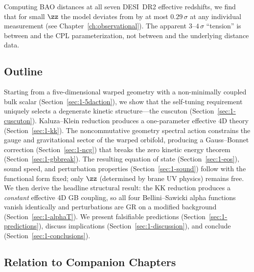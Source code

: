 Computing BAO distances at all seven DESI~DR2 effective redshifts, we find that for small $\zz$ the model deviates from \LCDM{} by at most $0.29\,\sigma$ at any individual measurement (see Chapter~\ref{ch:observational}). The apparent $3$--$4\,\sigma$ ``tension'' is between \LCDM{} and the CPL parameterization, not between \LCDM{} and the underlying distance data.

\subsection{Outline}
\label{sec:1-outline}

Starting from a five-dimensional warped geometry with a non-minimally coupled bulk scalar (Section~\ref{sec:1-5daction}), we show that the self-tuning requirement uniquely selects a degenerate kinetic structure---the cuscuton (Section~\ref{sec:1-cuscuton}). Kaluza--Klein reduction produces a one-parameter effective 4D theory (Section~\ref{sec:1-kk}). The noncommutative geometry spectral action constrains the gauge and gravitational sector of the warped orbifold, producing a Gauss--Bonnet correction (Section~\ref{sec:1-ncg}) that breaks the zero kinetic energy theorem (Section~\ref{sec:1-gbbreak}). The resulting equation of state (Section~\ref{sec:1-eos}), sound speed, and perturbation properties (Section~\ref{sec:1-sound}) follow with the functional form fixed; only $\zz$ (determined by brane UV physics) remains free. We then derive the headline structural result: the KK reduction produces a \emph{constant} effective 4D GB coupling, so all four Bellini--Sawicki alpha functions vanish identically and perturbations are GR on a modified background (Section~\ref{sec:1-alphaT}). We present falsifiable predictions (Section~\ref{sec:1-predictions}), discuss implications (Section~\ref{sec:1-discussion}), and conclude (Section~\ref{sec:1-conclusions}).

\subsection{Relation to Companion Chapters}
\label{sec:1-companion}

